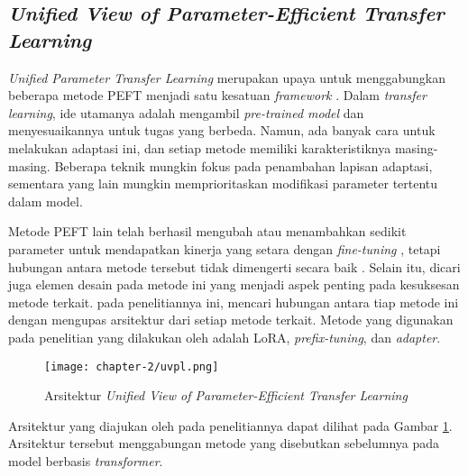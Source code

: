 \subsection{\textit{Unified View of Parameter-Efficient Transfer Learning}}

\textit{Unified Parameter Transfer Learning} merupakan upaya untuk menggabungkan beberapa metode PEFT menjadi satu kesatuan \textit{framework} \parencite{uvpl}. Dalam \textit{transfer learning}, ide utamanya adalah mengambil \textit{pre-trained model} dan menyesuaikannya untuk tugas yang berbeda. Namun, ada banyak cara untuk melakukan adaptasi ini, dan setiap metode memiliki karakteristiknya masing-masing. Beberapa teknik mungkin fokus pada penambahan lapisan adaptasi, sementara yang lain mungkin memprioritaskan modifikasi parameter tertentu dalam model.

Metode PEFT lain telah berhasil mengubah atau menambahkan sedikit parameter untuk mendapatkan kinerja yang setara dengan \textit{fine-tuning} , tetapi hubungan antara metode tersebut tidak dimengerti secara baik \parencite{uvpl}. Selain itu, dicari juga elemen desain pada metode ini yang menjadi aspek penting pada kesuksesan metode terkait. \citeauthor{uvpl} pada penelitiannya ini, mencari hubungan antara tiap metode ini dengan mengupas arsitektur dari setiap metode terkait. Metode yang digunakan pada penelitian yang dilakukan oleh \citeauthor{uvpl} adalah LoRA, \textit{prefix-tuning}, dan \textit{adapter}.

\begin{figure}[ht]
    \centering
    \texttt{[image: chapter-2/uvpl.png]}
    \caption{Arsitektur \textit{Unified View of Parameter-Efficient Transfer Learning} \parencite{uvpl}}
    \label{fig:uvpl}
\end{figure}

Arsitektur yang diajukan oleh \citeauthor{uvpl} pada penelitiannya dapat dilihat pada Gambar \ref{fig:uvpl}. Arsitektur tersebut menggabungan metode yang disebutkan sebelumnya pada model berbasis \textit{transformer}. 
